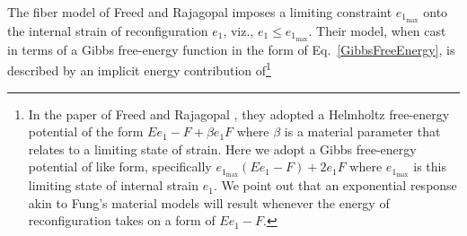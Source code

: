 The fiber model of Freed and Rajagopal \cite{FreedRajagopal16} imposes a limiting constraint $e_{1_{\max}}$ onto the internal strain of reconfiguration $e_1$, viz., $e_1 \leq e_{1_{\max}}$.  Their model, when cast in terms of a Gibbs free-energy function in the form of Eq.~\ref{GibbsFreeEnergy}, is described by an implicit energy contribution of\footnote{
    In the paper of Freed and Rajagopal \cite{FreedRajagopal16}, they adopted a Helmholtz free-energy potential of the form $E e_1 - F + \beta e_1 F$ where $\beta$ is a material parameter that relates to a limiting state of strain.  Here we adopt a Gibbs free-energy potential of like form, specifically $e_{1_{\max}} (E e_1 - F) + 2e_1 F$ where $e_{1_{\max}}$ is this limiting state of internal strain $e_1$.  We point out that an exponential response akin to Fung's material models will result whenever the energy of reconfiguration takes on a form of $E e_1 - F$.
}
